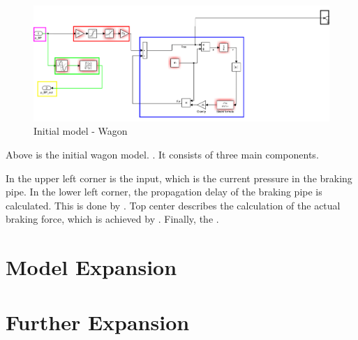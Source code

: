 \begin{figure}[H]
	\centering
	\includegraphics[width=\linewidth]{./pic/initmodel_wagon}
	\caption{Initial model - Wagon}
	\label{fig:initmodel_wagon}
\end{figure}

\par\noindent
Above is the initial wagon model. . It consists of three main components.
\par
In the upper left corner is the input, which is the current pressure in the braking pipe. In the lower left corner, the propagation delay of the braking pipe is calculated. This is done by \TODO{}. Top center describes the calculation of the actual braking force, which is achieved by \TODO{}. Finally, the .

\section{Model Expansion}
\label{sec:ModelExpansion}

\section{Further Expansion}
\label{sec:FurtherExpansion}